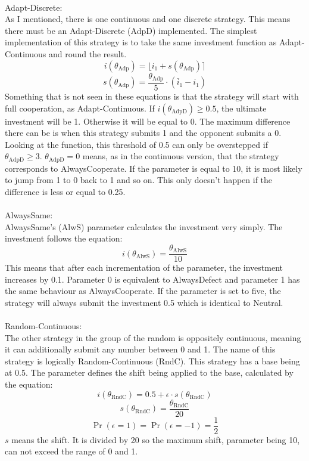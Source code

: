 \documentclass{article}
\newcommand{\round}[1]{\ensuremath{\lfloor#1\rceil}}
\begin{document}
\begin{itemize}
		\\Adapt-Discrete:\\
As I mentioned, there is one continuous and one discrete strategy.
This means there must be an Adapt-Discrete (AdpD) implemented.
The simplest implementation of this strategy is to take the same investment function as Adapt-Continuous and round the result.
$$i(\theta_{\mathrm{Adp}}) = \round{i_1 + s(\theta_{\mathrm{Adp}})}$$
$$s(\theta_{\mathrm{Adp}}) = \frac{\theta_{\mathrm{Adp}}}{5} \cdot (\bar i_1 - i_1)$$
Something that is not seen in these equations is that the strategy will start with full cooperation, as Adapt-Continuous.
If $i(\theta_{\mathrm{AdpD}}) \ge 0.5$, the ultimate investment will be 1.
Otherwise it will be equal to 0.
The maximum difference there can be is when this strategy submits 1 and the opponent submits a 0.
Looking at the function, this threshold of 0.5 can only be overstepped if $\theta_{\mathrm{AdpD}} \ge 3$.
$\theta_{\mathrm{AdpD}} = 0$ means, as in the continuous version, that the strategy corresponds to AlwaysCooperate.
If the parameter is equal to 10, it is most likely to jump from 1 to 0 back to 1 and so on.
This only doesn't happen if the difference is less or equal to 0.25.\\
		\\AlwaysSame:\\
AlwaysSame's (AlwS) parameter calculates the investment very simply.
The investment follows the equation: 
$$i(\theta_{\mathrm{AlwS}}) = \frac{\theta_{\mathrm{AlwS}}}{10}$$
This means that after each incrementation of the parameter, the investment increases by 0.1.
Parameter 0 is equivalent to AlwaysDefect and parameter 1 has the same behaviour as AlwaysCooperate.
If the parameter is set to five, the strategy will always submit the investment 0.5 which is identical to Neutral.\\
		\\Random-Continuous:\\
The other strategy in the group of the random is oppositely continuous, meaning it can additionally submit any number between 0 and 1.
The name of this strategy is logically Random-Continuous (RndC).
This strategy has a base being at 0.5.
The parameter defines the shift being applied to the base, calculated by the equation:
$$i(\theta_{\mathrm{RndC}}) = 0.5 + \epsilon \cdot s(\theta_{\mathrm{RndC}})$$
$$s(\theta_{\mathrm{RndC}}) = \frac{\theta_{\mathrm{RndC}}}{20}$$
$$\Pr(\epsilon = 1) = \Pr(\epsilon = -1) = \frac{1}{2}$$
$s$ means the shift.
It is divided by 20 so the maximum shift, parameter being 10, can not exceed the range of 0 and 1.

\end{itemize}
\end{document}
